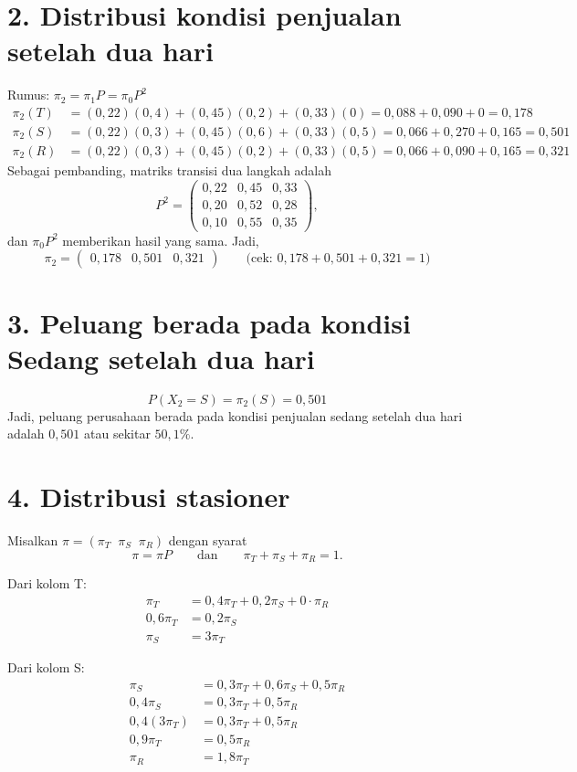 \documentclass[12pt,a4paper]{article}
\begin{document}
\section*{2. Distribusi kondisi penjualan setelah dua hari}

Rumus: $\pi_2 = \pi_1 P = \pi_0 P^2$
\begin{align*}
\pi_2(T) &= (0,22)(0,4) + (0,45)(0,2) + (0,33)(0) = 0,088 + 0,090 + 0 = 0,178 \\
\pi_2(S) &= (0,22)(0,3) + (0,45)(0,6) + (0,33)(0,5) = 0,066 + 0,270 + 0,165 = 0,501 \\
\pi_2(R) &= (0,22)(0,3) + (0,45)(0,2) + (0,33)(0,5) = 0,066 + 0,090 + 0,165 = 0,321
\end{align*}
Sebagai pembanding, matriks transisi dua langkah adalah
\[
P^2 =
\begin{pmatrix}
  0,22 & 0,45 & 0,33 \\
  0,20 & 0,52 & 0,28 \\
  0,10 & 0,55 & 0,35
\end{pmatrix},
\]
dan $\pi_0 P^2$ memberikan hasil yang sama. Jadi,
\[
\boxed{\pi_2 = \begin{pmatrix} 0,178 & 0,501 & 0,321 \end{pmatrix}}
\qquad \text{(cek: } 0,178 + 0,501 + 0,321 = 1\text{)}
\]

\section*{3. Peluang berada pada kondisi Sedang setelah dua hari}

\[
P(X_2 = S) = \pi_2(S) = \boxed{0,501}
\]
Jadi, peluang perusahaan berada pada kondisi penjualan sedang setelah dua hari adalah $0,501$ atau sekitar $50,1\%$.

\section*{4. Distribusi stasioner}

Misalkan $\pi = (\pi_T \;\; \pi_S \;\; \pi_R)$ dengan syarat
\[
\pi = \pi P \qquad \text{dan} \qquad \pi_T + \pi_S + \pi_R = 1.
\]

Dari kolom T:
\begin{align*}
\pi_T &= 0,4\pi_T + 0,2\pi_S + 0\cdot\pi_R \\
0,6\pi_T &= 0,2\pi_S \\
\pi_S &= 3\pi_T \tag{i}
\end{align*}

Dari kolom S:
\begin{align*}
\pi_S &= 0,3\pi_T + 0,6\pi_S + 0,5\pi_R \\
0,4\pi_S &= 0,3\pi_T + 0,5\pi_R \\
0,4(3\pi_T) &= 0,3\pi_T + 0,5\pi_R \\
0,9\pi_T &= 0,5\pi_R \\
\pi_R &= 1,8\pi_T \tag{ii}
\end{align*}
\end{document}
